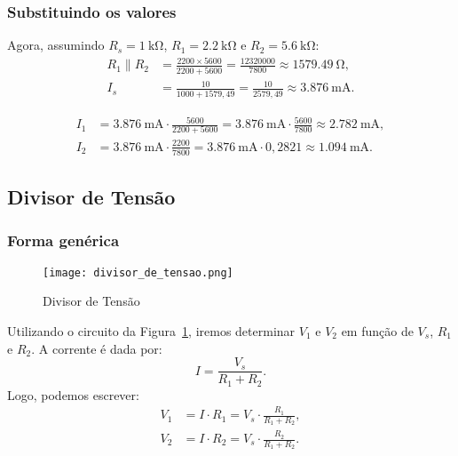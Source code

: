 \documentclass[a4paper, 12pt]{article}
\begin{document}
\subsubsection{Substituindo os valores}
Agora, assumindo $R_{s} = \SI{1}{\kilo\ohm}$, $R_{1} = \SI{2.2}{\kilo\ohm}$ e $R_{2} = \SI{5.6}{\kilo\ohm}$:\\[3pt]

\begin{align}
R_1 \parallel R_2 &= \frac{2200 \times 5600}{2200 + 5600} 
= \frac{12320000}{7800} \approx \SI{1579,49}{\ohm}, \\[6pt] 
I_s &= \frac{10}{1000 + 1579,49} 
= \frac{10}{2579,49} 
\approx \SI{3,876}{\milli\ampere}.
\end{align}

\begin{align*}
I_1 &= \SI{3,876}{\milli\ampere} \cdot \frac{5600}{2200 + 5600} 
= \SI{3,876}{\milli\ampere} \cdot \frac{5600}{7800} 
\approx \SI{2,782}{\milli\ampere}, \\[6pt]
I_2 &= \SI{3,876}{\milli\ampere} \cdot \frac{2200}{7800} 
= \SI{3,876}{\milli\ampere} \cdot 0,2821 
\approx \SI{1,094}{\milli\ampere}.
\end{align*}

\subsection{Divisor de Tensão}
\subsubsection{Forma genérica}

\begin{figure}[H]
\centering
\texttt{[image: divisor\_de\_tensao.png]}
\caption{Divisor de Tensão}
\label{fig:divisor_de_tensao}
\end{figure}

Utilizando o circuito da Figura~\ref{fig:divisor_de_tensao}, iremos determinar $V_1$ e $V_2$ em função de $V_s$, $R_1$ e $R_2$.
A corrente é dada por:
\begin{equation}
I = \frac{V_s}{R_1 + R_2}.
\end{equation}
Logo, podemos escrever:
\begin{align}
V_1 &= I \cdot R_1 = V_s \cdot \frac{R_1}{R_1 + R_2}, \\[6pt]
V_2 &= I \cdot R_2 = V_s \cdot \frac{R_2}{R_1 + R_2}.
\end{align}
\end{document}
